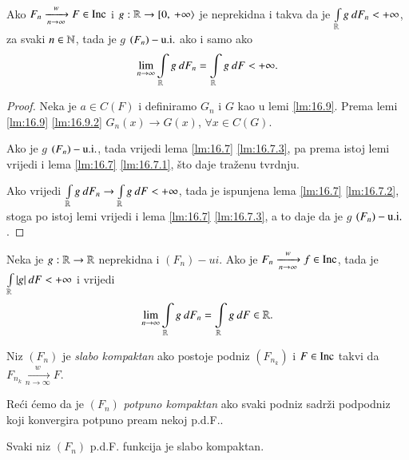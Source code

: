 \begin{lm}  \label{lm:16.13}
    Ako $F_n \xrightarrow[n \to \infty]{w} F \in \mathrm{Inc}$ i $g: \mathbb{R} \to [ {0}, \: {+\infty} \rangle$ je neprekidna i takva da je $\int\limits_{\mathbb{R}} g \: d F_n < +\infty$, za svaki $n \in \mathbb{N}$, tada je $g$ $(F_n)-\mathrm{u.i.}$ ako i samo ako
    \begin{equation*}
        \lim\limits_{n \to \infty} \int\limits_{\mathbb{R}} g \: d F_n = \int\limits_{\mathbb{R}} g \: d F < +\infty.
    \end{equation*}
\end{lm}

\begin{proof}
    Neka je $a \in C(F)$ i definiramo $G_n$ i $G$ kao u lemi \ref{lm:16.9}.
    Prema lemi \ref{lm:16.9} \ref{lm:16.9.2} $G_n (x) \to G(x)$, $\forall x \in C(G)$.
    
    Ako je $g$ $(F_n)-\mathrm{u.i.}$, tada vrijedi lema \ref{lm:16.7} \ref{lm:16.7.3}, pa prema istoj lemi vrijedi i lema \ref{lm:16.7} \ref{lm:16.7.1}, \v sto daje tra\v zenu tvrdnju.

    Ako vrijedi $\int\limits_{\mathbb{R}} g \: d F_n \to \int\limits_{\mathbb{R}} g \: d F < +\infty$, tada je ispunjena lema \ref{lm:16.7} \ref{lm:16.7.2}, stoga po istoj lemi vrijedi i lema \ref{lm:16.7} \ref{lm:16.7.3}, a to daje da je $g$ $(F_n)-\mathrm{u.i.}$.
\end{proof}

\begin{kor} \label{kor:16.14}
    Neka je $g: \mathbb{R} \to \mathbb{R}$ neprekidna i $(F_n)-ui$.
    Ako je $F_n \xrightarrow[n \to \infty]{w} f \in \mathrm{Inc}$, tada je $\int\limits_{\mathbb{R}} |g| \: d F < +\infty$ i vrijedi
    \begin{equation*}
        \lim\limits_{n \to \infty} \int\limits_{\mathbb{R}} g \: d F_n = \int\limits_{\mathbb{R}} g \: d F \in \mathbb{R}.
    \end{equation*} 
\end{kor}

\begin{defn}    \label{defn:16.15}
    Niz $(F_n)$ je \emph{slabo kompaktan} ako postoje podniz $(F_{n_k})$ i $F \in \mathrm{Inc}$ takvi da $F_{n_k} \xrightarrow[n \to \infty]{w} F$.

    Re\' ci \' cemo da je $(F_n)$ \emph{potpuno kompaktan} ako svaki podniz sadr\v zi podpodniz koji konvergira potpuno pream nekoj p.d.F..
\end{defn}

\begin{tm}  \label{tm:16.16}
    Svaki niz $(F_n)$ p.d.F. funkcija je slabo kompaktan.
\end{tm}

